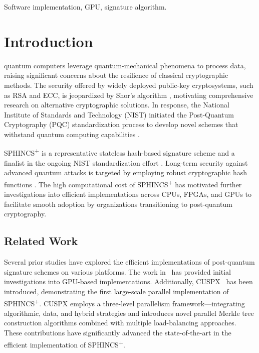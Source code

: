\documentclass[journal]{IEEEtran}
\begin{document}
\begin{IEEEkeywords}
  Software implementation, GPU, signature algorithm.
\end{IEEEkeywords}

\section{Introduction}
\label{sec:intro}

 quantum computers leverage quantum-mechanical phenomena to process data, raising significant concerns about the resilience of classical cryptographic methods.
The security offered by widely deployed public-key cryptosystems, such as RSA and ECC, is jeopardized by Shor's algorithm \cite{Shor1994}, motivating comprehensive research on alternative cryptographic solutions. In response, the National Institute of Standards and Technology (NIST) initiated the Post-Quantum Cryptography (PQC) standardization process to develop novel schemes that withstand quantum computing capabilities \cite{NIST2016}.

SPHINCS\textsuperscript{+} is a representative stateless hash-based signature scheme and a finalist in the ongoing NIST standardization effort \cite{Turan}. Long-term security against advanced quantum attacks is targeted by employing robust cryptographic hash functions \cite{Bernstein2019}. The high computational cost of SPHINCS\textsuperscript{+} has motivated further investigations into efficient implementations across CPUs, FPGAs, and GPUs \cite{Joseph2022} to facilitate smooth adoption by organizations transitioning to post-quantum cryptography.

\color{blue}

\subsection{Related Work}


Several prior studies have explored the efficient implementations of post-quantum signature schemes on various platforms. The work in~\cite{Joseph2022} has provided initial investigations into GPU-based implementations. Additionally, CUSPX~\cite{Wang2025} has been introduced, demonstrating the first large-scale parallel implementation of SPHINCS\textsuperscript{+}. CUSPX employs a three-level parallelism framework—integrating algorithmic, data, and hybrid strategies and introduces novel parallel Merkle tree construction algorithms combined with multiple load-balancing approaches. These contributions have significantly advanced the state-of-the-art in the efficient implementation of SPHINCS\textsuperscript{+}.
\end{document}
